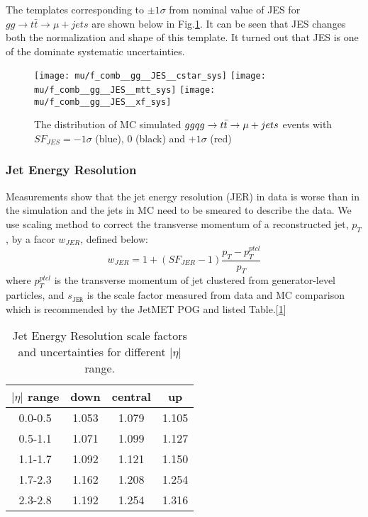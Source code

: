 The templates corresponding to $\pm 1\sigma$ from nominal value of JES for $gg\rightarrow t\bar{t}\rightarrow \mu+jets$ are shown below in Fig.\ref{fig:gg_JES_templates}. It can be seen that JES changes both the normalization and shape of this template. It turned out that JES is one of the dominate systematic uncertainties.

\begin{figure}[hbt]
  \begin{center}
    \texttt{[image: mu/f\_comb\_\_gg\_\_JES\_\_cstar\_sys]}
    \texttt{[image: mu/f\_comb\_\_gg\_\_JES\_\_mtt\_sys]}
    \texttt{[image: mu/f\_comb\_\_gg\_\_JES\_\_xf\_sys]}

  \caption{\small The distribution of MC simulated $gg\/qg\rightarrow t\bar{t}\rightarrow \mu+jets$ events with $SF_{JES} = -1\sigma$ (blue), 0 (black) and $+1\sigma$ (red)}
    \label{fig:gg_JES_templates}
  \end{center}
\end{figure}


\subsubsection{Jet Energy Resolution}
Measurements show that the jet energy resolution (JER) in data is worse than in the simulation and the jets in MC need to be smeared to describe the data. We use scaling method to correct the transverse momentum of a reconstructed jet, $p_T$, by a facor $w_{JER}$, defined below:
\begin{equation}
w_{JER}=1+(SF_{JER}-1)\frac{p_T-p_T ^{ptcl}}{p_T}
\end{equation}
where $p_T ^{ptcl}$ is the transverse momentum of jet clustered from generator-level particles, and $s_{\texttt{JER}}$ is the scale factor measured from data and MC comparison which is recommended by the JetMET POG\cite{JER_wiki} and listed Table.[\ref{tab:JER_SF}]

\begin{table}[htb]
\centering
\begin{tabular}{|cccc|}
\hline
$|\eta|$ range	 & down 		& central 	 &  up              \\ \hline
0.0-0.5     		 &  1.053       & 1.079   & 1.105             \\
0.5-1.1 	         &  1.071       & 1.099   & 1.127             \\ 
1.1-1.7          &  1.092       & 1.121   & 1.150              \\ 
1.7-2.3          &  1.162        & 1.208  & 1.254             \\
2.3-2.8          &  1.192       & 1.254   & 1.316              \\  \hline 
\end{tabular}
\caption{ Jet Energy Resolution scale factors and uncertainties for different $|\eta|$ range. }
\label{tab:JER_SF}
\end{table}


